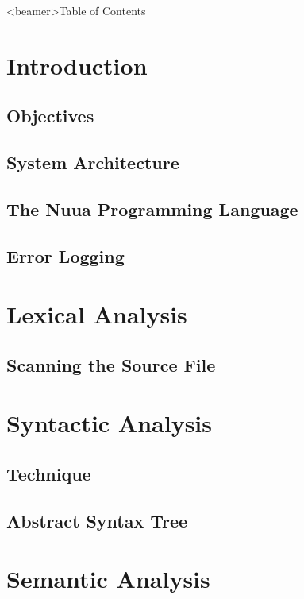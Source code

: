 



\frame{\titlepage}
\begin{frame}<beamer>{Table of Contents}
    \begin{small}
    \tableofcontents[
        subsectionstyle=hide,
    ]
    \end{small}
\end{frame}
\section{Introduction}
\subsection{Objectives}

\subsection{System Architecture}

\subsection{The Nuua Programming Language}

\subsection{Error Logging}

\section{Lexical Analysis}
\subsection{Scanning the Source File}

\section{Syntactic Analysis}
\subsection{Technique}

\subsection{Abstract Syntax Tree}

\section{Semantic Analysis}

